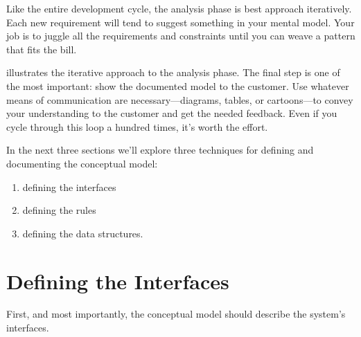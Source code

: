 Like the entire development cycle, the analysis phase is best approach
iteratively. Each new requirement will tend to suggest something in
your mental model. Your job is to juggle all the requirements and
constraints until you can weave a pattern that fits the bill.


 illustrates the iterative approach to the analysis phase.
The final step is one of the most important: show the documented model
to the customer. Use whatever means of communication are
necessary---diagrams, tables, or cartoons---to convey your
understanding to the customer and get the needed feedback. Even if you
cycle through this loop a hundred times, it's worth the effort.

In the next three sections we'll explore three techniques for defining
and documenting the conceptual model:

\begin{enumerate}
\item defining the interfaces
\item defining the rules
\item defining the data structures.
\end{enumerate}

\section{Defining the Interfaces}

\begin{tip}
First, and most importantly, the conceptual model should describe the
system's interfaces.
\end{tip}

